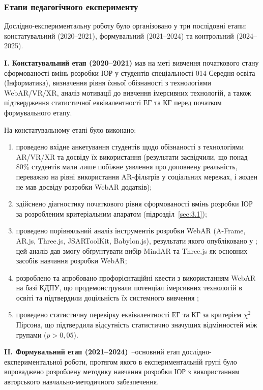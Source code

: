 \subsubsection{Етапи педагогічного експерименту}

Дослідно-експериментальну роботу було організовано у три послідовні етапи: констатувальний (2020--2021), формувальний (2021--2024) та контрольний (2024--2025).

\textbf{I. Констатувальний етап (2020--2021)} мав на меті вивчення початкового стану сформованості вмінь розробки ІОР у студентів спеціальності 014 Середня освіта (Інформатика), визначення рівня їхньої обізнаності з технологіями WebAR/VR/XR, аналіз мотивації до вивчення імерсивних технологій, а також підтвердження статистичної еквівалентності ЕГ та КГ перед початком формувального етапу.

На констатувальному етапі було виконано:
\begin{enumerate}
\item проведено вхідне анкетування студентів щодо обізнаності з технологіями AR/VR/XR та досвіду їх використання (результати засвідчили, що понад 80\% студентів мали лише побіжне уявлення про доповнену реальність, переважно на рівні використання AR-фільтрів у соціальних мережах, і жоден не мав досвіду розробки WebAR додатків);
\item здійснено діагностику початкового рівня сформованості вмінь розробки ІОР за розробленим критеріальним апаратом (підрозділ~\ref{sec:3.1});
\item проведено порівняльний аналіз інструментів розробки WebAR (A-Frame, AR.js, Three.js, JSARToolKit, Babylon.js), результати якого опубліковано у \cite{Shepiliev2020WebAR}; цей аналіз дав змогу обґрунтувати вибір MindAR та Three.js як основних засобів навчання розробки WebAR;
\item розроблено та апробовано профорієнтаційні квести з використанням WebAR на базі КДПУ, що продемонстрували потенціал імерсивних технологій в освіті та підтвердили доцільність їх системного вивчення \cite{Shepiliev2021Career};
\item проведено статистичну перевірку еквівалентності ЕГ та КГ за критерієм $\chi^2$ Пірсона, що підтвердила відсутність статистично значущих відмінностей між групами ($p > 0{,}05$).
\end{enumerate}

\textbf{II. Формувальний етап (2021--2024)}~--основний етап дослідно-експериментальної роботи, протягом якого в експериментальній групі було впроваджено розроблену методику навчання розробки ІОР з використанням авторського навчально-методичного забезпечення.

